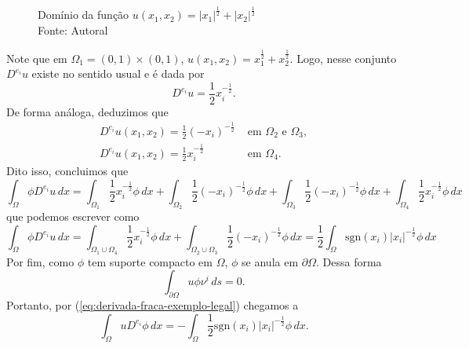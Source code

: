 \documentclass[a4paper, 11pt]{book}
\theoremstyle{definition}
\newcommand{\sgn}{\mathrm{sgn}}
\begin{document}
\begin{ex}
\begin{figure}[H]
        \caption{Domínio da função $u(x_1,x_2) = |x_1|^{\frac{1}{2}} + |x_2|^{\frac{1}{2}}$\\
        Fonte: Autoral}
        \label{fig:dominio}
    \end{figure}
    Note que em $\Omega_1 = (0,1) \times (0,1)$, $u(x_1,x_2) = x_1^{\frac{1}{2}} + x_2^{\frac{1}{2}}$. Logo, nesse conjunto $D^{e_i} u$ existe no sentido usual e é dada por
    \[
        D^{e_i} u = \frac{1}{2} x_i^{-\frac{1}{2}}.
    \]
    De forma análoga, deduzimos que
    \[
        \begin{array}{ll}
            D^{e_i} u(x_1,x_2) = \frac{1}{2} (-x_i)^{-\frac{1}{2}} &\text{ em } \Omega_2 \text{ e } \Omega_3, \\
            D^{e_i} u(x_1,x_2) = \frac{1}{2} x_i^{-\frac{1}{2}} &\text{ em } \Omega_4.
        \end{array}
    \]
    Dito isso, concluimos que
    \[
        \int_\Omega \phi D^{e_i}u \,dx = \int_{\Omega_1}  \frac{1}{2} x_i^{-\frac{1}{2}}\phi \,dx + \int_{\Omega_2} \frac{1}{2} (-x_i)^{-\frac{1}{2}} \phi \,dx + \int_{\Omega_3} \frac{1}{2} (-x_i)^{-\frac{1}{2}} \phi \,dx + \int_{\Omega_4} \frac{1}{2} x_i^{-\frac{1}{2}} \phi \,dx
    \]
    que podemos escrever como
    \[
        \int_\Omega \phi D^{e_i} u \,dx = \int_{\Omega_1 \cup \Omega_4}  \frac{1}{2} x_i^{-\frac{1}{2}}\phi \,dx + \int_{\Omega_2 \cup \Omega_3} \frac{1}{2} (-x_i)^{-\frac{1}{2}} \phi \,dx = \frac{1}{2}\int_\Omega \sgn(x_i) |x_i|^{-\frac{1}{2}} \phi \,dx
    \]
    Por fim, como $\phi$ tem suporte compacto em $\Omega$, $\phi$ se anula em $\partial\Omega$.
    Dessa forma
    \[
        \int_{\partial\Omega} u \phi \nu^i \,ds = 0.
    \]
    Portanto, por (\ref{eq:derivada-fraca-exemplo-legal}) chegamos a
    \[
        \int_\Omega  u D^{e_i} \phi \,dx = - \int_\Omega \frac{1}{2}\sgn(x_i) |x_i|^{-\frac{1}{2}} \phi \,dx.
\]
\end{ex}
\end{document}
